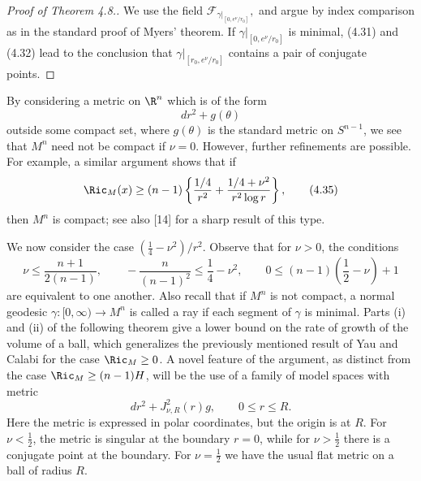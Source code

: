 \begin{proof}[Proof of Theorem 4.8.]
We use the field $\mathcal{F}_{\gamma|_{[0,e^{\nu}/r_0]}},$ and argue by index
comparison as in the standard proof of Myers' theorem. If
$\gamma|_{[0,e^{\nu}/r_0]}$ is minimal, (4.31) and (4.32) lead to the conclusion
that $\gamma|_{[r_0,e^{\nu}/r_0]}$ contains a pair of conjugate points.
\end{proof}

\begin{remark}
\label{rem:borderline-asymptotic-ricci-compactness}

By considering a metric on $\R^n$ which is of the form
\begin{equation}
dr^2 + g(\theta)
\tag{4.34}
\end{equation}
outside some compact set, where $g(\theta)$ is the standard metric on $S^{n-1}$,
we see that $M^n$ need not be compact if $\nu = 0$. However, further refinements
are possible. For example, a similar argument shows that if
\begin{equation}
\Ric_M(x) \ge (n-1)\left\{\frac{1/4}{r^2} + \frac{1/4 + \nu^2}{r^2\log r}\right\},
\tag{4.35}
\end{equation}
then $M^n$ is compact; see also [14] for a sharp result of this type.
\end{remark}

We now consider the case $(\frac14-\nu^2)/r^2$. Observe that for $\nu>0$, the
conditions
\begin{equation}
\nu \le \frac{n+1}{2(n-1)}, \qquad
-\frac{n}{(n-1)^2} \le \frac14-\nu^2, \qquad
0 \le (n-1)\left(\frac12-\nu\right)+1
\tag{4.36}
\end{equation}
are equivalent to one another. Also recall that if $M^n$ is not compact, a
normal geodesic $\gamma:[0,\infty)\to M^n$ is called a ray if each segment of
$\gamma$ is minimal. Parts (i) and (ii) of the following theorem give a lower
bound on the rate of growth of the volume of a ball, which generalizes the
previously mentioned result of Yau and Calabi for the case $\Ric_M\ge 0$.
A novel feature of the argument, as distinct from the case
$\Ric_M\ge (n-1)H$, will be the use of a family of model spaces with metric
\[
dr^2 + J^2_{\nu,R}(r)g,\qquad 0\le r\le R.
\]
Here the metric is expressed in polar coordinates, but the origin is at $R$.
For $\nu<\frac12$, the metric is singular at the boundary $r=0$, while for
$\nu>\frac12$ there is a conjugate point at the boundary. For $\nu=\frac12$
we have the usual flat metric on a ball of radius $R$.

